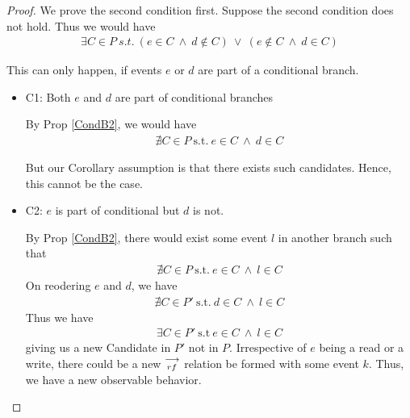     \begin{proof}
      
        
        We prove the second condition first. 
        Suppose the second condition does not hold. Thus we would have
            \begin{align*}
                \exists C \in P \ s.t. \ 
                (e \in C \ \wedge \ d \notin C) \ \vee \ 
                (e \notin C \ \wedge \ d \in C)
            \end{align*}
            
            This can only happen, if events $e$ or $d$ are part of a conditional branch.
            \begin{itemize}
                \item C1: Both $e$ and $d$ are part of conditional branches

                    By Prop \ref{CondB2}, we would have 
                    \begin{align*}
                        \nexists C \in P \ \text{s.t.} \ e \in C \ \wedge \ d \in C 
                    \end{align*}

                    But our Corollary assumption is that there exists such candidates. Hence, this cannot be the case. 

                \item C2: $e$ is part of conditional but $d$ is not. 
            
                    By Prop \ref{CondB2}, there would exist some event $l$ in another branch such that 
                    \begin{align*}
                        \nexists C \in P \ \text{s.t.} \ e \in C \ \wedge \ l \in C 
                    \end{align*}
                    On reodering $e$ and $d$, we have 
                    \begin{align*}
                        \nexists C \in P' \ \text{s.t.} \ d \in C \ \wedge \ l \in C 
                    \end{align*}
                    Thus we have 
                    \begin{align*}
                        \exists C \in P' \ \text{s.t} \ e \in C \ \wedge \ l \in C
                    \end{align*}
                    giving us a new Candidate in $P'$ not in $P$. 
                    Irrespective of $e$ being a read or a write, there could be a new $\stackrel{\longrightarrow}{_{rf}}$ relation be formed with some event $k$. Thus, we have a new observable behavior. 


\end{itemize}
\end{proof}
